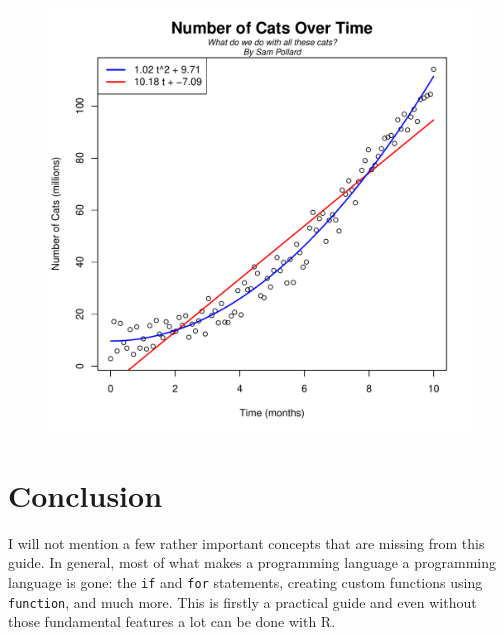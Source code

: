 \documentclass[12pt]{article}
\begin{document}
\begin{figure}[h]
\centering
\includegraphics[scale=0.7]{sample_plot}
\end{figure}



\section{Conclusion}
I will not mention a few rather important concepts that are missing from this guide. In general, most of what makes a programming language a programming language is gone: the \verb|if| and \verb|for| statements, creating custom functions using \verb|function|, and much more. This is firstly a practical guide and even without those fundamental features a lot can be done with R.
\end{document}
